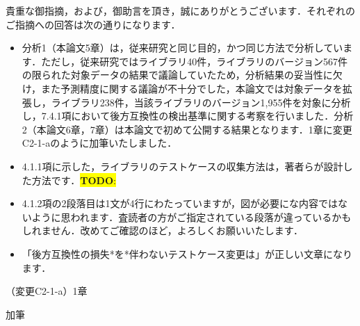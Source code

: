 \documentclass{jarticle} %
\newcommand{\todo}[1]{\colorbox{yellow}{{\bf TODO}:}{\color{red}{\textbf{[#1]}}}}
\def\subsection#1{ \vspace{1pc} {\gt #1} }
\begin{document}
貴重な御指摘，および，御助言を頂き，誠にありがとうございます．それぞれのご指摘への回答は次の通りになります．
\begin{itemize}
    \item 分析1（本論文5章）は，従来研究と同じ目的，かつ同じ方法で分析しています．ただし，従来研究ではライブラリ40件，ライブラリのバージョン567件の限られた対象データの結果で議論していたため，分析結果の妥当性に欠け，また予測精度に関する議論が不十分でした，本論文では対象データを拡張し，ライブラリ238件，当該ライブラリのバージョン1,955件を対象に分析し，7.4.1項において後方互換性の検出基準に関する考察を行いました．分析2（本論文6章，7章）は本論文で初めて公開する結果となります．1章に変更C2-1-aのように加筆いたしました．
    \item 4.1.1項に示した，ライブラリのテストケースの収集方法は，著者らが設計した方法です．\todo{妥当性への脅威に入れるか．．．}
    \item 4.1.2項の2段落目は1文が4行にわたっていますが，図が必要にな内容ではないように思われます．査読者の方がご指定されている段落が違っているかもしれません．改めてご確認のほど，よろしくお願いいたします．
    \item 「後方互換性の損失*を*伴わないテストケース変更は」が正しい文章になります．
\end{itemize}

\subsection{（変更C2-1-a）1章}
\vspace{-0.3cm}
\begin{description}
\item 加筆\\
\phantom{　}
\textcolor{red}{}
\end{description}
\end{document}
